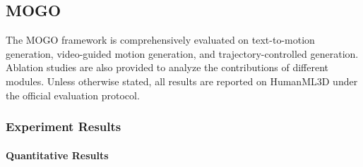 \documentclass[a4paper,12pt]{article}
\begin{document}
\subsection{MOGO}
The MOGO framework is comprehensively evaluated on text-to-motion generation, video-guided motion generation, and trajectory-controlled generation. Ablation studies are also provided to analyze the contributions of different modules. Unless otherwise stated, all results are reported on HumanML3D under the official evaluation protocol.


\subsubsection{Experiment Results}
\paragraph{Quantitative Results}
\end{document}
